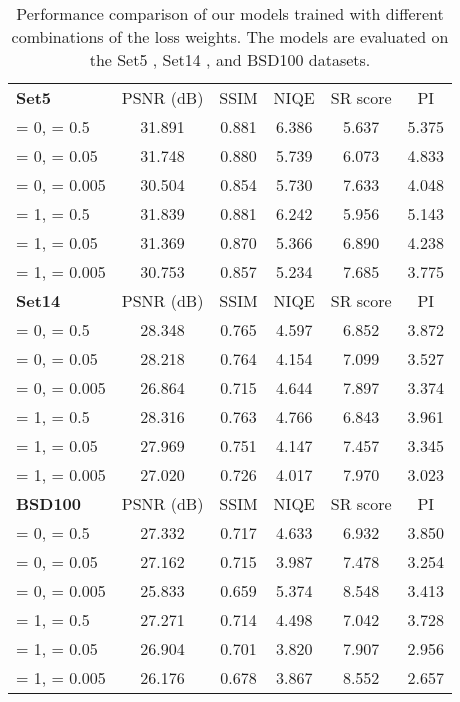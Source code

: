 \documentclass[runningheads]{llncs}
\begin{document}
\begin{table}[t]
	\setlength{\tabcolsep}{0.4em}
	\scriptsize
	\centering
	\caption{Performance comparison of our models trained with different combinations of the loss weights. The models are evaluated on the Set5 \cite{bevilacqua2012low}, Set14 \cite{zeyde2010single}, and BSD100 \cite{martin2001database} datasets.}
	\label{table:result_loss_weight_comparison}
	\begin{tabular}{lccccc}
		\textbf{Set5} & PSNR (dB) & SSIM & NIQE & SR score & PI \\
		\noalign{\smallskip}
		\hline
		\noalign{\smallskip}
		= 0, = 0.5 & 31.891 & 0.881 & 6.386 & 5.637 & 5.375 \\
		= 0, = 0.05 & 31.748 & 0.880 & 5.739 & 6.073 & 4.833 \\
		= 0, = 0.005 & 30.504 & 0.854 & 5.730 & 7.633 & 4.048 \\
		= 1, = 0.5 & 31.839 & 0.881 & 6.242 & 5.956 & 5.143 \\
		= 1, = 0.05 & 31.369 & 0.870 & 5.366 & 6.890 & 4.238 \\
		= 1, = 0.005 & 30.753 & 0.857 & 5.234 & 7.685 & 3.775 \\
		\noalign{\smallskip}
		\noalign{\smallskip}
		\textbf{Set14} & PSNR (dB) & SSIM & NIQE & SR score & PI \\
		\noalign{\smallskip}
		\hline
		\noalign{\smallskip}
		= 0, = 0.5 & 28.348 & 0.765 & 4.597 & 6.852 & 3.872 \\
		= 0, = 0.05 & 28.218 & 0.764 & 4.154 & 7.099 & 3.527 \\
		= 0, = 0.005 & 26.864 & 0.715 & 4.644 & 7.897 & 3.374 \\
		= 1, = 0.5 & 28.316 & 0.763 & 4.766 & 6.843 & 3.961 \\
		= 1, = 0.05 & 27.969 & 0.751 & 4.147 & 7.457 & 3.345 \\
		= 1, = 0.005 & 27.020 & 0.726 & 4.017 & 7.970 & 3.023 \\
		\noalign{\smallskip}
		\noalign{\smallskip}
		\textbf{BSD100} & PSNR (dB) & SSIM & NIQE & SR score & PI \\
		\noalign{\smallskip}
		\hline
		\noalign{\smallskip}
		= 0, = 0.5 & 27.332 & 0.717 & 4.633 & 6.932 & 3.850 \\
		= 0, = 0.05 & 27.162 & 0.715 & 3.987 & 7.478 & 3.254 \\
		= 0, = 0.005 & 25.833 & 0.659 & 5.374 & 8.548 & 3.413 \\
		= 1, = 0.5 & 27.271 & 0.714 & 4.498 & 7.042 & 3.728 \\
		= 1, = 0.05 & 26.904 & 0.701 & 3.820 & 7.907 & 2.956 \\
		= 1, = 0.005 & 26.176 & 0.678 & 3.867 & 8.552 & 2.657
	\end{tabular}
\end{table}
\end{document}
